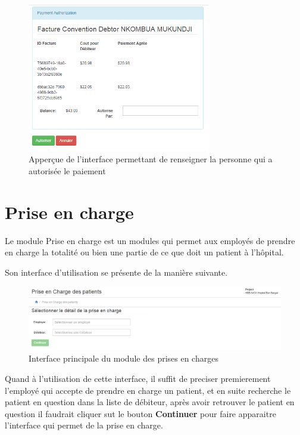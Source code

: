 \documentclass[12pt,a4paper]{report}
\begin{document}
\begin{figure}[h]
\begin{center}
\includegraphics[width=8cm]{pic/PCConfirm.png}
\end{center}
\caption{Apperçue de l'interface permettant de renseigner la personne qui a autorisée le paiement}
\label{Apperçue de l'interface permettant de renseigner la personne qui a autorisée le paiement}
\end{figure}


\newpage
\section{ Prise en charge}
Le module  Prise en charge est un modules qui permet aux employés de prendre en charge la totalité ou bien une partie de ce que doit un patient à l'hôpital. 

Son interface d'utilisation se présente de la manière suivante.

\begin{figure}[h]
\begin{center}
\includegraphics[width=14cm]{pic/InterPrinPrisCharge.png}
\end{center}
\caption{Interface principale du module des prises en charges}
\label{Interface principale du module des prises en charges}
\end{figure}

Quand à l'utilisation de cette interface, il suffit de preciser premierement l'employé qui accepte de prendre en charge un patient, et en suite recherche le patient en question dans la liste de débiteur, après avoir retrouver le patient en question il faudrait cliquer sut le bouton  \textbf{Continuer} pour faire apparaitre l'interface qui permet de la prise en charge.
\end{document}
